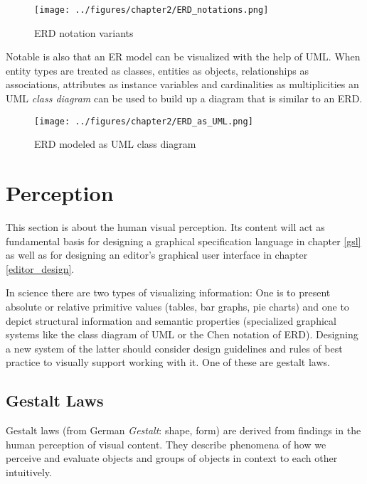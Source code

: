 \documentclass[twoside, openright, 12pt]{book}
\begin{document}
\begin{figure}[htb]
	\centering
	\texttt{[image: ../figures/chapter2/ERD\_notations.png]}
	\caption{ERD notation variants}
	\label{fig:ERD_notations}
\end{figure}

Notable is also that an ER model can be visualized with the help of UML.
When entity types are treated as classes, entities as objects, relationships as associations, attributes as instance variables and cardinalities as multiplicities an UML \textit{class diagram} can be used to build up a diagram that is similar to an ERD.

\begin{figure}[htb]
	\centering
	\texttt{[image: ../figures/chapter2/ERD\_as\_UML.png]}
	\caption{ERD modeled as UML class diagram}
	\label{fig:ERD_as_UML}
\end{figure}




\section{Perception}
\label{perception}
This section is about the human visual perception.
Its content will act as fundamental basis for designing a graphical specification language in chapter \ref{gsl} as well as for designing an editor's graphical user interface in chapter \ref{editor_design}.

In science there are two types of visualizing information:
One is to present absolute or relative primitive values (tables, bar graphs, pie charts) and one to depict structural information and semantic properties (specialized graphical systems like the class diagram of UML or the Chen notation of ERD).
Designing a new system of the latter should consider design guidelines and rules of best practice to visually support working with it.
One of these are gestalt laws.

\subsection{Gestalt Laws}
\label{gestalt_laws}
Gestalt laws (from German \textit{Gestalt}: shape, form) are derived from findings in the human perception of visual content.
They describe phenomena of how we perceive and evaluate objects and groups of objects in context to each other intuitively.
\end{document}
